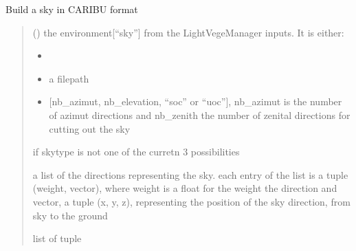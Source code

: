 \documentclass[letterpaper,10pt,english]{sphinxmanual}
\begin{document}
\begin{fulllineitems}
\label{\detokenize{reference:sky.CARIBUsky}}
\pysigstartsignatures
{}
\pysigstopsignatures
\sphinxAtStartPar
Build a sky in CARIBU format
\begin{quote}\begin{description}
\sphinxAtStartPar
{} () \textendash{} 
\sphinxAtStartPar
the environment{[}“sky”{]} from the LightVegeManager inputs. It is either:
\begin{itemize}
\item {} 
\sphinxAtStartPar
{}

\item {} 
\sphinxAtStartPar
a filepath

\item {} 
\sphinxAtStartPar
{[}nb\_azimut, nb\_elevation, “soc” or “uoc”{]}, nb\_azimut is the number of azimut directions and nb\_zenith the number of zenital directions for cutting out the sky

\end{itemize}


\sphinxAtStartPar
{} \textendash{} if skytype is not one of the curretn 3 possibilities

\sphinxAtStartPar
a list of the directions representing the sky.
each entry of the list is a tuple (weight, vector), where weight is a float for the weight the direction and vector, a tuple (x, y, z),
representing the position of the sky direction, from sky to the ground

\sphinxAtStartPar
list of tuple

\end{description}\end{quote}

\end{fulllineitems}

\end{document}
